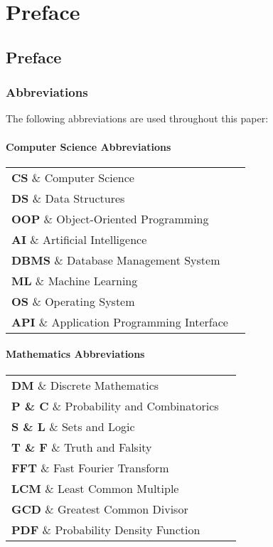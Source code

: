 \chapter{Preface}
\section{Preface}\label{sec:preface}

\subsection{Abbreviations}

The following abbreviations are used throughout this paper:

\subsubsection{Computer Science Abbreviations}

\begin{tabular}{ll}
    \textbf{CS} \& Computer Science \\
    \textbf{DS} \& Data Structures \\
    \textbf{OOP} \& Object-Oriented Programming \\
    \textbf{AI} \& Artificial Intelligence \\
    \textbf{DBMS} \& Database Management System \\
    \textbf{ML} \& Machine Learning \\
    \textbf{OS} \& Operating System \\
    \textbf{API} \& Application Programming Interface \\
\end{tabular}

\subsubsection{Mathematics Abbreviations}

\begin{tabular}{ll}
    \textbf{DM} \& Discrete Mathematics \\
    \textbf{P \& C} \& Probability and Combinatorics \\
    \textbf{S \& L} \& Sets and Logic \\
    \textbf{T \& F} \& Truth and Falsity \\
    \textbf{FFT} \& Fast Fourier Transform \\
    \textbf{LCM} \& Least Common Multiple \\
    \textbf{GCD} \& Greatest Common Divisor \\
    \textbf{PDF} \& Probability Density Function \\
\end{tabular}


